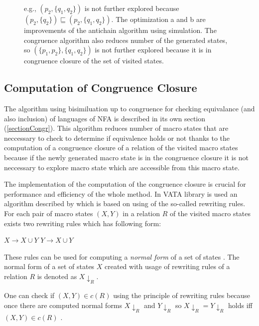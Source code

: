 \begin{figure}[bht]
\begin{center}
{{      e.g., $(p_2,\{q_1,q_2\})$ is not further explored because $(p_2,\{q_2\}) \sqsubseteq (p_2,\{q_1,q_2\})$. 
      The optimization a and b are improvements of the antichain algorithm using simulation. 
      The congruence algorithm also reduces number of the generated states, so $(\{p_1,p_2\},\{q_1,q_2\})$ 
      is not further explored because it is in congruence closure 
      of the set of visited states.}}
  \label{automata}
\end{center}
\end{figure}

\subsection{Computation of Congruence Closure}
\label{subsectionCongr}
The algorithm using bisimiluation up to congruence for checking equivalance (and also inclusion)
of languages of NFA is described in its own section (\ref{sectionCongr}). This algorithm
reduces number of macro states that are neccessary to check to determine if equivalence
holds or not thanks to the computation of a congruence closure of a relation
of the visited macro states because if the newly generated macro state is in the congruence closure it is not neccessary to explore macro state which
are accessible from this macro state. 

The implementation of the computation of the congruence closure is crucial for performance and efficiency of the whole method. In VATA library is used
an algorithm described by \cite{popl13} which is based on using of the so-called rewriting rules. For each pair of macro states $(X,Y)$ in 
a relation $R$ of the visited macro states exists two rewriting rules which has following form:
\begin{center}
$X\rightarrow X\cup Y$ \hspace{5cm} $Y\rightarrow X\cup Y$
\end{center}
These rules can be used for computing a \emph{normal form} of a set of states \cite{popl13}. The normal form of a set of states $X$ created with
usage of rewriting rules of a relation $R$ is denoted as $X{\downarrow_R}$.

One can check if $(X,Y)\in c(R)$ using the principle of rewriting rules because once there are computed normal forms $X{\downarrow_R}$ and $Y{\downarrow_R}$ so
$X{\downarrow_R}=Y{\downarrow_R}$ holds iff $(X,Y)\in c(R)$ \cite{popl13}.

